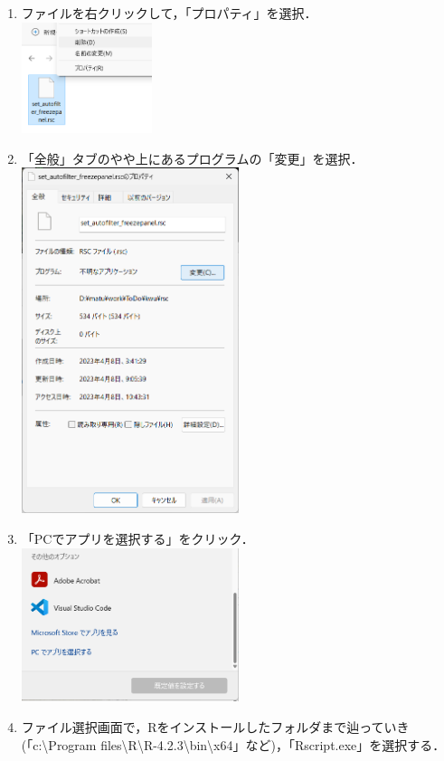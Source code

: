 \documentclass[
]{article}
\begin{document}
\begin{enumerate}
\item
  ファイルを右クリックして，「プロパティ」を選択．\\
  \includegraphics[width=0.3\textwidth,height=\textheight]{img/assoc_02.png}
\item
  「全般」タブのやや上にあるプログラムの「変更」を選択．\\
  \includegraphics[width=0.5\textwidth,height=\textheight]{img/assoc_03.png}
\item
  「PCでアプリを選択する」をクリック．\\
  \includegraphics[width=0.5\textwidth,height=\textheight]{img/assoc_04.png}
\item
  ファイル選択画面で，Rをインストールしたフォルダまで辿っていき(「c:\textbackslash Program files\textbackslash R\textbackslash R-4.2.3\textbackslash bin\textbackslash x64」など)，「Rscript.exe」を選択する．\\

\end{enumerate}
\end{document}
